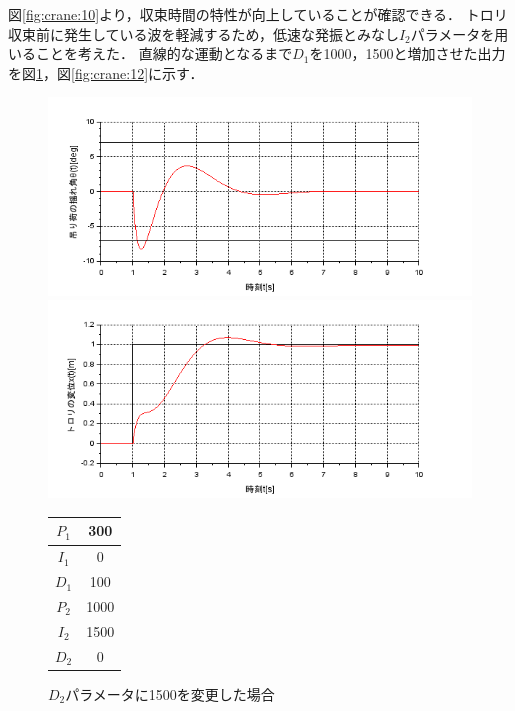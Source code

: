 \documentclass[dvipdfmx,titlepage,a4j]{jsarticle}  %
\begin{document}
図\ref{fig:crane:10}より，収束時間の特性が向上していることが確認できる．
トロリ収束前に発生している波を軽減するため，低速な発振とみなし$I_2$パラメータを用いることを考えた．
直線的な運動となるまで$D_1$を1000，1500と増加させた出力を図\ref{fig:crane:11}，図\ref{fig:crane:12}に示す．

\begin{figure}[H]
  \begin{minipage}{4.5cm}
    \centering
    \includegraphics[keepaspectratio, scale=0.35]{../graph/crane/ang-P1-300-I1-0-D1-100-P2-1000-I2-1500-D2-0.png}
  \end{minipage}
  \hfill
  \begin{minipage}{4.5cm}
    \centering
    \includegraphics[keepaspectratio, scale=0.35]{../graph/crane/po-P1-300-I1-0-D1-100-P2-1000-I2-1500-D2-0.png}
  \end{minipage}
  \hfill
  \begin{minipage}{3cm}
    \begin{center}
      \begin{tabular}{c|c}
        \hline
        $P_1$ & 300\\ \hline
        $I_1$ & 0\\ \hline
        $D_1$ & 100\\ \hline
        $P_2$ & 1000\\ \hline
        $I_2$ & 1500\\ \hline
        $D_2$ & 0\\
        \hline
      \end{tabular}
    \end{center}
  \end{minipage}
  \hfill
  \caption{$D_2$パラメータに1500を変更した場合}
  \label{fig:crane:11}
\end{figure}
\end{document}
